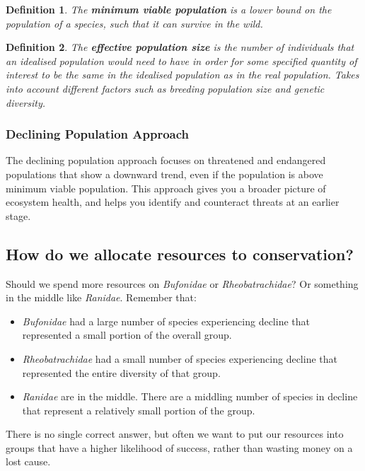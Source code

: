 \documentclass[12pt]{article}
\newtheorem*{definition}{Definition}
\begin{document}
\begin{definition}
    The \textbf{minimum viable population} is a lower bound on the population of a species, such that it can survive in the wild.
\end{definition}

\begin{definition}
    The \textbf{effective population size} is the number of individuals that an idealised population would need to have in order for some specified quantity of interest to be the same in the idealised population as in the real population. Takes into account different factors such as breeding population size and genetic diversity.
\end{definition}

\subsubsection{Declining Population Approach}

The declining population approach focuses on threatened and endangered populations that show a downward trend, even if the population is above minimum viable population. This approach gives you a broader picture of ecosystem health, and helps you identify and counteract threats at an earlier stage.

\subsection{How do we allocate resources to conservation?}

Should we spend more resources on \textit{Bufonidae} or \textit{Rheobatrachidae}? Or something in the middle like \textit{Ranidae}. Remember that: 
\begin{itemize}
    \item \textit{Bufonidae} had a large number of species experiencing decline that represented a small portion of the overall group.
    \item \textit{Rheobatrachidae} had a small number of species experiencing decline that represented the entire diversity of that group.
    \item \textit{Ranidae} are in the middle. There are a middling number of species in decline that represent a relatively small portion of the group.
\end{itemize}

There is no single correct answer, but often we want to put our resources into groups that have a higher likelihood of success, rather than wasting money on a lost cause.
\end{document}
